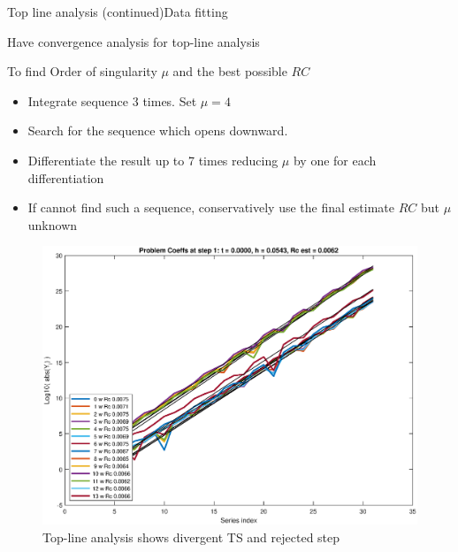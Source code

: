 \documentclass[11pt,svgnames,fleqn]{beamer}
\begin{document}
\begin{frame}{Top line analysis (continued)}{Data fitting}

Have convergence analysis for top-line analysis

\vspace{4mm}

To find Order of singularity $\mu$ and the best possible $RC$

  \begin{itemize}

    \item Integrate sequence 3 times. Set $\mu = 4$

    \vspace{4mm}
  
    \item Search for the sequence which opens downward.
      
    \vspace{4mm}
      
    \item Differentiate the result up to 7 times reducing $\mu$ by one for each differentiation

    \vspace{4mm}

    \item If cannot find such a sequence, conservatively use the final estimate $RC$ but $\mu$ unknown
  \end{itemize}
\end{frame}

\begin{frame}

\begin{figure}
  \centering
  \vspace{-0.4cm}
  \includegraphics[width=.9\linewidth]{divergent.eps} %
  \caption{Top-line analysis shows divergent TS and rejected step}
\end{figure}

\end{frame}
\end{document}
